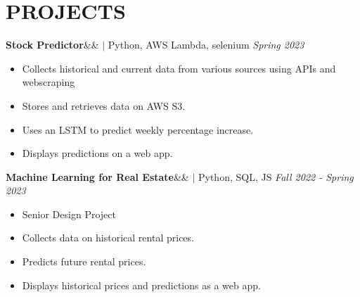 \documentclass[11pt, a4paper, roman]{moderncv}
\newcommand{\project}[5]{
	\textbf{#1}\ifx&#2&{}
	\else
    		\href{#2}{\:\small\faGithub\:}\fi$|$ #3
	\hfill\textit{#4}
	#5
	\vspace{2mm}
}
\begin{document}
\vspace*{-2mm}
\section{PROJECTS}

{\project{Stock Predictor}{}{Python, AWS Lambda, selenium}{Spring 2023}
	{\begin{itemize}
		\item Collects historical and current data from various sources using APIs and webscraping
		\item Stores and retrieves data on AWS S3.
		\item Uses an LSTM to predict weekly percentage increase.
		\item Displays predictions on a web app.
	\end{itemize}}
}		


{\project{Machine Learning for Real Estate}{}{Python, SQL, JS}{Fall 2022 - Spring 2023}
	{\begin{itemize}
		\item Senior Design Project
		\item Collects data on historical rental prices.
		\item Predicts future rental prices.
		\item Displays historical prices and predictions as a web app.
	\end{itemize}}
}
\end{document}
